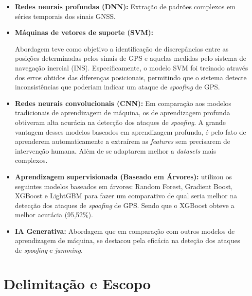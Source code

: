 \documentclass[12pt]{article}
\begin{document}
\begin{itemize}
    \item \textbf{Redes neurais profundas (DNN):}
     Extração de padrões complexos em séries temporais dos sinais GNSS.
     \cite{isleyenGPSSpoofingDetection2024}

    \item \textbf{Máquinas de vetores de suporte (SVM):}

     Abordagem teve como objetivo a identificação
     de discrepâncias entre as posições determinadas pelos sinais de GPS
     e aquelas medidas pelo sistema de navegação inercial (INS).
     Especificamente, o modelo SVM foi treinado através dos erros obtidos
     das diferenças posicionais,
     permitindo que o sistema detecte inconsistências que poderiam
     indicar um ataque de \textit{spoofing} de GPS.
     \cite{panice2017}
    
    \item \textbf{Redes neurais convolucionais (CNN):} Em comparação
    aos modelos tradicionais de aprendizagem de máquina,
    os de aprendizagem profunda obtiveram alta acurácia na detecção dos
    ataques de \textit{spoofing}.
    A grande vantagem desses modelos baseados em aprendizagem profunda,
    é pelo fato de aprenderem automaticamente a extraírem as \textit{features}
    sem precisarem de intervenção humana. Além de se adaptarem melhor
    a \textit{datasets} mais complexos. \cite{cnn2023}

    
    \item \textbf{Aprendizagem supervisionada (Baseado em Árvores):}
    \textcite{Aissou2021} utilizou os seguintes modelos baseados
     em árvores: Random Forest, Gradient Boost, XGBoost e LightGBM
     para fazer um comparativo de qual seria melhor na detecção dos ataques
     de \textit{spoofing} de GPS.
     Sendo que o XGBoost obteve a melhor acurácia (95,52\%).

    \item \textbf{IA Generativa:}  Abordagem que em comparação com outros
    modelos de aprendizagem de máquina, se destacou pela eficácia
    na deteção dos ataques de \textit{spoofing} e \textit{jamming}.
    \cite{elalamiDroneDefGANtGenerativeAIBased2024}
    
\end{itemize}

\section{Delimitação e Escopo}
\end{document}

